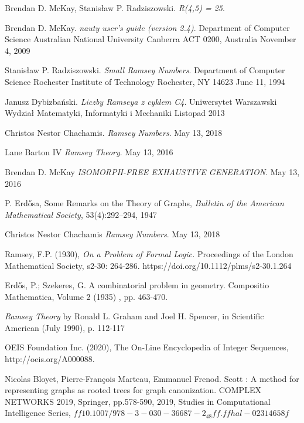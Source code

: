 \documentclass[11pt]{article}
\begin{document}
\pagebreak
\begin{thebibliography}{9}
  Brendan D. McKay, Stanisław P. Radziszowski. 
  \textit{R(4,5) = 25}. 
  
  Brendan D. McKay.
  \textit{nauty user's guide (version 2.4)}.  
  Department of Computer Science
  Australian National University
  Canberra ACT 0200, Australia
  November 4, 2009

  Stanisław P. Radziszowski.
  \textit{Small Ramsey Numbers}.  
  Department of Computer Science Rochester Institute of Technology Rochester, NY 14623
  June 11, 1994

  Janusz Dybizbański.
  \textit{Liczby Ramseya z cyklem C4}.  
  Uniwersytet Warszawski
  Wydział Matematyki, Informatyki i Mechaniki
  Listopad 2013

  Christos Nestor Chachamis.
  \textit{Ramsey Numbers}.  
  May 13, 2018

  Lane Barton IV
  \textit{Ramsey Theory}.  
  May 13, 2016

  Brendan D. McKay
  \textit{ISOMORPH-FREE EXHAUSTIVE GENERATION}.  
  May 13, 2016
  
  P.  Erdősa,  Some  Remarks  on  the  Theory  of  Graphs,
  \textit{Bulletin  of  the  American  Mathematical  Society},
  53(4):292–294,  1947
  
  Christos Nestor Chachamis
  \textit{Ramsey Numbers}.  
  May 13, 2018

 Ramsey, F.P. (1930), 
 \textit{On a Problem of Formal Logic.}
 Proceedings of the London Mathematical Society, s2-30: 264-286. https://doi.org/10.1112/plms/s2-30.1.264
 
 Erdős, P.; Szekeres, G.
 A combinatorial problem in geometry. Compositio Mathematica, Volume 2 (1935) , pp. 463-470.
  
  \textit{Ramsey Theory}
   by Ronald L. Graham and Joel H. Spencer, in Scientific American (July 1990), p. 112-117
   
       OEIS Foundation Inc. (2020), The On-Line Encyclopedia of Integer Sequences, http://oeis.org/A000088.

       Nicolas Bloyet, Pierre-François Marteau, Emmanuel Frenod. Scott : A method for representing graphs
      as rooted trees for graph canonization. COMPLEX NETWORKS 2019, Springer, pp.578-590, 2019,
      Studies in Computational Intelligence Series, $ff10.1007/978-3-030-36687-2_48ff. ffhal-02314658f$

  \end{thebibliography}
\end{document}
